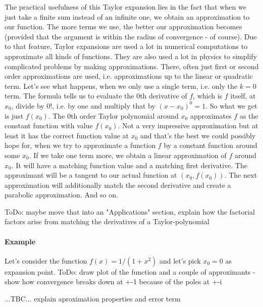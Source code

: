 
\medskip
The practical usefulness of this Taylor expansion lies in the fact that when we just take a finite sum instead of an infinite one, we obtain an approximation to our function. The more terms we use, the better our approximation becomes (provided that the argument is within the radius of convergence - of course). Due to that feature, Taylor expansions are used a lot in numerical computations to approximate all kinds of functions. They are also used a lot in physics to simplify complicated problems by making approximations. There, often just first or second order approximations are used, i.e. approximations up to the linear or quadratic term. Let's see what happens, when we only use a single term, i.e. only the $k=0$ term. The formula tells us to evaluate the $0$th derivative of $f$, which is $f$ itself, at $x_0$, divide by $0!$, i.e. by one and multiply that by $(x-x_0)^0 = 1$. So what we get is just $f(x_0)$. The $0$th order Taylor polynomial around $x_0$ approximates $f$ as the constant function with value $f(x_0)$. Not a very impressive approximation but at least it has the correct function value at $x_0$ and that's the best we could possibly hope for, when we try to approximate a function $f$ by a constant function around some $x_0$. If we take one term more, we obtain a linear approximation of $f$ around $x_0$. It will have a matching function value and a matching first derivative. The approximant will be a tangent to our actual function at $(x_0, f(x_0))$. The next approximation will additionally match the second derivative and create a parabolic approximation. And so on.

ToDo: maybe move that into an "Applications" section, explain how the factorial factors arise from matching the derivatives of a Taylor-polynomial

\paragraph{Example} Let's consider the function $f(x) = 1 / (1 + x^2)$ and let's pick $x_0 = 0$ as expansion point. ToDo: draw plot of the function and a couple of approximants - show how convergence breaks down at +-1 because of the poles at +-i

\medskip
...TBC... explain aproximation properties and error term




